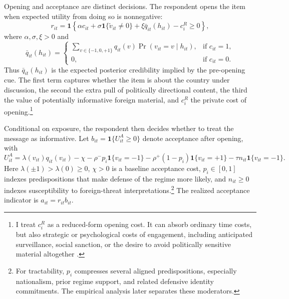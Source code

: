 \documentclass[12pt,american]{article}
\begin{document}
	Opening and acceptance are distinct decisions. The respondent opens the item when expected utility from doing so is nonnegative:
	\[
	r_{it}=\mathbf{1}\left\{\alpha c_{it}+\sigma \mathbf{1}\{\tilde v_{it}\neq 0\}+\xi \bar q_{it}(h_{it})-c_i^R\ge 0\right\},
	\]
	where \(\alpha,\sigma,\xi>0\) and
	\[
	\bar q_{it}(h_{it})=
	\begin{cases}
		\sum_{v\in\{-1,0,+1\}} q_{it}(v)\Pr(v_{it}=v\mid h_{it}), & \text{if } c_{it}=1,\\
		0, & \text{if } c_{it}=0.
	\end{cases}
	\]
	Thus \(\bar q_{it}(h_{it})\) is the expected posterior credibility implied by the pre-opening cue. The first term captures whether the item is about the country under discussion, the second the extra pull of politically directional content, the third the value of potentially informative foreign material, and \(c_i^R\) the private cost of opening.\footnote{I treat \(c_i^R\) as a reduced-form opening cost. It can absorb ordinary time costs, but also strategic or psychological costs of engagement, including anticipated surveillance, social sanction, or the desire to avoid politically sensitive material altogether \citep{Kuran1991,Kuran1995}.}
	
	Conditional on exposure, the respondent then decides whether to treat the message as informative. Let \(b_{it}=\mathbf{1}\{U_{it}^A\ge 0\}\) denote acceptance after opening, with
	\[
	U_{it}^{A}=\lambda(v_{it})q_{it}(v_{it})-\chi-\rho^{-}p_i\mathbf{1}\{v_{it}=-1\}-\rho^{+}(1-p_i)\mathbf{1}\{v_{it}=+1\}-\tau n_{it}\mathbf{1}\{v_{it}=-1\}.
	\]
	Here \(\lambda(\pm 1)>\lambda(0)\ge 0\), \(\chi>0\) is a baseline acceptance cost, \(p_i\in[0,1]\) indexes predispositions that make defense of the regime more likely, and \(n_{it}\ge 0\) indexes susceptibility to foreign-threat interpretations.\footnote{For tractability, \(p_i\) compresses several aligned predispositions, especially nationalism, prior regime support, and related defensive identity commitments. The empirical analysis later separates these moderators.} The realized acceptance indicator is \(a_{it}=r_{it}b_{it}\).
	
\end{document}

